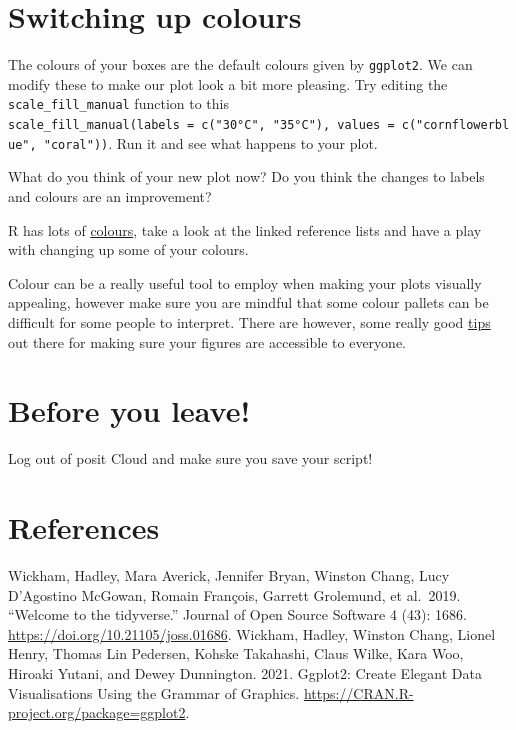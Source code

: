 \documentclass[
]{book}
\begin{document}
\hypertarget{colours}{%
\section{Switching up colours}\label{colours}}

The colours of your boxes are the default colours given by \texttt{ggplot2}. We can modify these to make our plot look a bit more pleasing. Try editing the \texttt{scale\_fill\_manual} function to this \texttt{scale\_fill\_manual(labels\ =\ c("30°C",\ "35°C"),\ values\ =\ c("cornflowerblue",\ "coral"))}. Run it and see what happens to your plot.

What do you think of your new plot now? Do you think the changes to labels and colours are an improvement?

R has lots of \href{https://www.datanovia.com/en/blog/awesome-list-of-657-r-color-names/}{colours}, take a look at the linked reference lists and have a play with changing up some of your colours.

Colour can be a really useful tool to employ when making your plots visually appealing, however make sure you are mindful that some colour pallets can be difficult for some people to interpret. There are however, some really good \href{https://www.tableau.com/en-gb/about/blog/examining-data-viz-rules-dont-use-red-green-together\#:~:text=Use\%20a\%20colour\%2Dblind\%2Dfriendly\%20palette\%20when\%20appropriate\&text=For\%20example\%2C\%20blue\%2Forange\%20is,blue\%20to\%20someone\%20with\%20CVD}{tips} out there for making sure your figures are accessible to everyone.

\hypertarget{before-you-leave-4}{%
\section{Before you leave!}\label{before-you-leave-4}}

Log out of posit Cloud and make sure you save your script!

\hypertarget{references-5}{%
\section{References}\label{references-5}}

Wickham, Hadley, Mara Averick, Jennifer Bryan, Winston Chang, Lucy D'Agostino McGowan, Romain François, Garrett Grolemund, et al.~2019. ``Welcome to the tidyverse.'' Journal of Open Source Software 4 (43): 1686. \url{https://doi.org/10.21105/joss.01686}.
Wickham, Hadley, Winston Chang, Lionel Henry, Thomas Lin Pedersen, Kohske Takahashi, Claus Wilke, Kara Woo, Hiroaki Yutani, and Dewey Dunnington. 2021. Ggplot2: Create Elegant Data Visualisations Using the Grammar of Graphics. \url{https://CRAN.R-project.org/package=ggplot2}.
\end{document}

